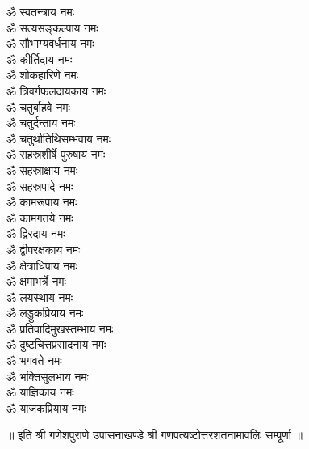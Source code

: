 \begin{multicols}{2}
\begin{flushleft}
ॐ स्वतन्त्राय नमः\\
ॐ सत्यसङ्कल्पाय नमः\\
ॐ सौभाग्यवर्धनाय नमः\\
ॐ कीर्तिदाय नमः\\
ॐ शोकहारिणे नमः\\
ॐ त्रिवर्गफलदायकाय नमः\\
ॐ चतुर्बाहवे नमः\\
ॐ चतुर्दन्ताय नमः\hfill{}\\
ॐ चतुर्थातिथिसम्भवाय नमः\\
ॐ सहस्रशीर्षे पुरुषाय नमः\\
ॐ सहस्राक्षाय नमः\\
ॐ सहस्रपादे नमः\\
ॐ कामरूपाय नमः\\
ॐ कामगतये नमः\\
ॐ द्विरदाय नमः\\
ॐ द्वीपरक्षकाय नमः\\
ॐ क्षेत्राधिपाय नमः\\
ॐ क्षमाभर्त्रे नमः\hfill{}\\
ॐ लयस्थाय नमः\\
ॐ लड्डुकप्रियाय नमः\\
ॐ प्रतिवादिमुखस्तम्भाय नमः\\
ॐ दुष्टचित्तप्रसादनाय नमः\\
ॐ भगवते नमः\\
ॐ भक्तिसुलभाय नमः\\
ॐ याज्ञिकाय नमः\\
ॐ याजकप्रियाय नमः\\
\end{flushleft}
\end{multicols}
\centerline{॥ इति श्री गणेशपुराणे उपासनाखण्डे श्री गणपत्यष्टोत्तरशतनामावलिः सम्पूर्णा ॥}
